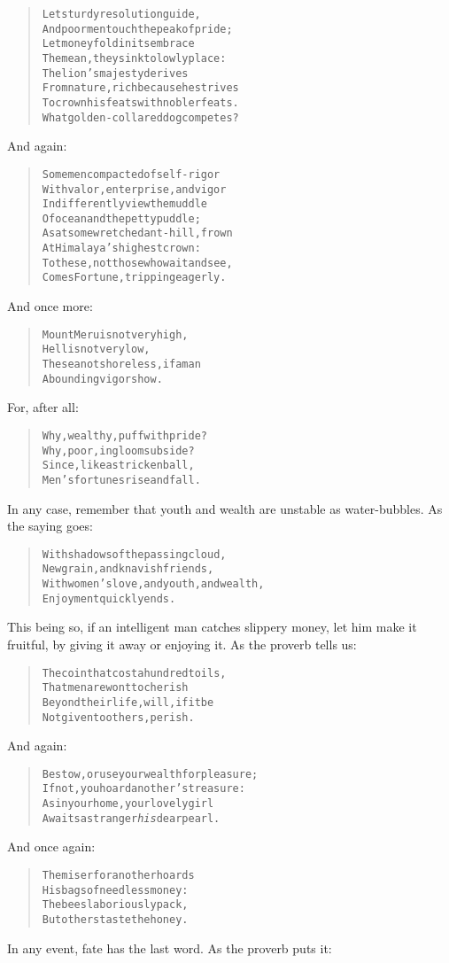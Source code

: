 \documentclass[article, twoside, 14pt]{memoir}
\renewenvironment{verbatim}{%
\begin{quote}%
\vskip -10pt%
\begin{alltt}\normalfont\large}{\end{alltt}%
\end{quote}%
\vskip -10pt
} %
\begin{document}
\begin{verbatim}
Let sturdy resolution guide,
And poor men touch the peak of pride;
Let money fold in its embrace
The mean, they sink to lowly place:
The lion's majesty derives
From nature, rich because he strives
To crown his feats with nobler feats.
What golden-collared dog competes?
\end{verbatim}
And again:

\begin{verbatim}
Some men compacted of self-rigor
With valor, enterprise, and vigor
Indifferently view the muddle
Of ocean and the petty puddle;
As at some wretched ant-hill, frown
At Himalaya's highest crown:
To these, not those who wait and see,
Comes Fortune, tripping eagerly.
\end{verbatim}
And once more:

\begin{verbatim}
Mount Meru is not very high,
    Hell is not very low,
The sea not shoreless, if a man
    Abounding vigor show.
\end{verbatim}
For, after all:

\begin{verbatim}
Why, wealthy, puff with pride?
Why, poor, in gloom subside?
Since, like a stricken ball,
Men's fortunes rise and fall.
\end{verbatim}
In any case, remember that youth and wealth are unstable as
water-bubbles. As the saying goes:

\begin{verbatim}
With shadows of the passing cloud,
    New grain, and knavish friends,
With women's love, and youth, and wealth,
    Enjoyment quickly ends.
\end{verbatim}
This being so, if an intelligent man catches slippery money, let
him make it fruitful, by giving it away or enjoying it. As the
proverb tells us:

\begin{verbatim}
The coin that cost a hundred toils,
    That men are wont to cherish
Beyond their life, will, if it be
    Not given to others, perish.
\end{verbatim}
And again:

\begin{verbatim}
Bestow, or use your wealth for pleasure;
If not, you hoard another's treasure:
As in your home, your lovely girl
Awaits a stranger{\textemdash}\emph{his} dear pearl.
\end{verbatim}
And once again:

\begin{verbatim}
The miser for another hoards
    His bags of needless money:
The bees laboriously pack,
    But others taste the honey.
\end{verbatim}
In any event, fate has the last word. As the proverb puts it:
\end{document}
